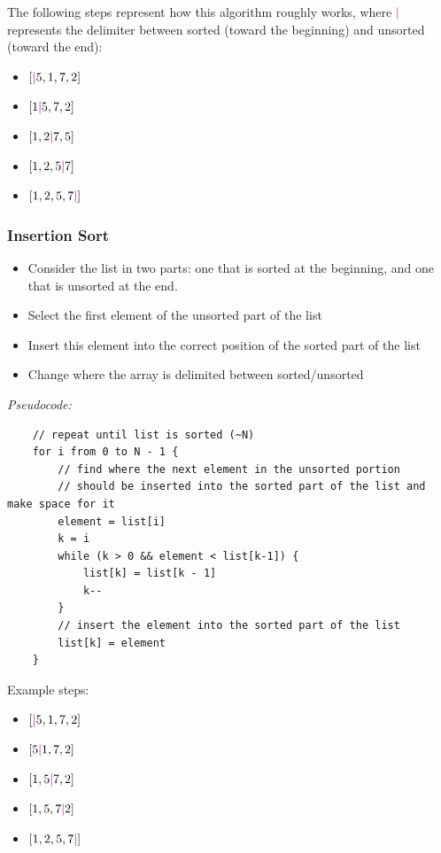 \documentclass[12pt]{article}
\begin{document}
\newcommand{\blue}[1]{\textcolor{violet}{#1}}

The following steps represent how this algorithm roughly works, where $\blue{|}$ represents the delimiter between sorted (toward the beginning) and unsorted (toward the end):

\begin{itemize}
    \item $[\blue{|}5,1,7,2]$
    \item $[1\blue{|}5,7,2]$
    \item $[1,2\blue{|}7,5]$
    \item $[1,2,5\blue{|}7]$
    \item $[1,2,5,7\blue{|}]$
\end{itemize}

\subsubsection{Insertion Sort}
\begin{itemize}
    \item Consider the list in two parts: one that is sorted at the beginning, and one that is unsorted at the end.
    \item Select the first element of the unsorted part of the list
    \item Insert this element into the correct position of the sorted part of the list
    \item Change where the array is delimited between sorted/unsorted
\end{itemize}

\textit{Pseudocode:}

\begin{verbatim}
    // repeat until list is sorted (~N)
    for i from 0 to N - 1 {
        // find where the next element in the unsorted portion 
        // should be inserted into the sorted part of the list and make space for it
        element = list[i]
        k = i
        while (k > 0 && element < list[k-1]) {
            list[k] = list[k - 1]
            k--
        }
        // insert the element into the sorted part of the list 
        list[k] = element
    }
\end{verbatim}

Example steps:

\begin{itemize}
    \item $[\blue{|}5,1,7,2]$
    \item $[5\blue{|}1,7,2]$
    \item $[1,5\blue{|}7,2]$
    \item $[1,5,7\blue{|}2]$
    \item $[1,2,5,7\blue{|}]$
\end{itemize}
\end{document}
